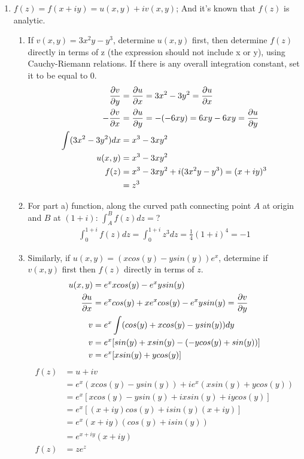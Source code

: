\documentclass[12pt]{article}
\begin{document}
\begin{enumerate}
	\item $f(z)=f(x+iy)=u(x,y)+iv(x,y)$; And it's known that $f(z)$ is analytic.
		\begin{enumerate}

		    \item If $v(x,y) = 3x^{2} y-y^{3}$, determine $u(x,y)$ first, then determine $f(z)$ directly in terms of z (the expression should not include x or y), using Cauchy-Riemann relations. If there is any overall integration constant, set it to be equal to $0$.
			    \begin{align*}
				    \pdv{v}{y}&=\pdv{u}{x}=3x^{2}-3y^{2}=\pdv{u}{x}\\
				    -\pdv{v}{x}&=\pdv{u}{y}=-(-6xy)=6xy-6xy=\pdv{u}{y}\\
				    \int(3x^{2}-3y^{2})dx&=x^{3}-3xy^{2}\\
				    u(x,y)&=x^{3}-3xy^{2}\\
				    f(z)&=x^{3}-3xy^{2}+i(3x^{2}y-y^{3})=(x+iy)^{3}\\
					&=z^{3}
			    \end{align*}
		\item For part a) function, along the curved path connecting point $A$ at origin and $B$ at $(1+i)$: $\int_{A}^{B}f(z)dz=$?
			\begin{align*}
				\int_{0}^{1+i}f(z)dz = \int_{0}^{1+i}z^{3}dz = \frac{1}{4}(1+i)^{4} = -1
			\end{align*}
		\item Similarly, if $u(x,y) = (xcos(y)-ysin(y))e^{x}$, determine if $v(x,y)$ first then $f(z)$ directly in terms of $z$.
			\begin{align*}
				u(x,y)&=e^{x}xcos(y)-e^{x}ysin(y)\\
				\pdv{u}{x}&=e^{x}cos(y)+xe^{x}cos(y)-e^{x}ysin(y)=\pdv{v}{y}\\
				v&=e^{x}\int(cos(y)+xcos(y)-ysin(y))dy\\
				v&=e^{x}[sin(y)+xsin(y)-(-ycos(y)+sin(y))]\\
				v&=e^{x}[xsin(y)+ycos(y)]
			\end{align*}
			\begin{align*}
				f(z)&=u+iv\\
				    &=e^{x}(xcos(y)-ysin(y))+ie^{x}(xsin(y)+ycos(y))\\
				    &=e^{x}[xcos(y)-ysin(y)+ixsin(y)+iycos(y)]\\
				    &=e^{x}[(x+iy)cos(y)+isin(y)(x+iy)]\\
				    &=e^{x}(x+iy)(cos(y)+isin(y))\\
				    &=e^{x+iy}(x+iy)\\
				f(z)&=ze^{z}
			\end{align*}
		\end{enumerate}


\end{enumerate}
\end{document}
